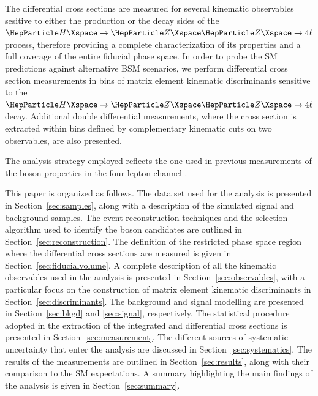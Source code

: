 The differential cross sections are measured for several kinematic observables sesitive to either the production or the decay sides of the $\HZZfl$ process, therefore providing a complete characterization of its properties and a full coverage of the entire fiducial phase space.
In order to probe the SM predictions against alternative BSM scenarios, we perform differential cross section measurements in bins of matrix element kinematic discriminants sensitive to the $\HZZfl$ decay.
Additional double differential measurements, where the cross section is extracted within bins defined by complementary kinematic cuts on two observables, are also presented. 

The analysis strategy employed reflects the one used in previous measurements of the \PH boson properties in the four lepton channel \cite{CMSH4lFiducial8TeV, CMSHIG19001}.

This paper is organized as follows. 
The data set used for the analysis is presented in Section~\ref{sec:samples}, along with a description of the simulated signal and background samples.
The event reconstruction techniques and the selection algorithm used to identify the \PH boson candidates are outlined in Section~\ref{sec:reconstruction}.
The definition of the restricted phase space region where the differential cross sections are measured is given in Section~\ref{sec:fiducialvolume}.
A complete description of all the kinematic observables used in the analysis is presented in Section~\ref{sec:observables}, with a particular focus on the construction of matrix element kinematic discriminants in Section~\ref{sec:discriminants}.
The background and signal modelling are presented in Section~\ref{sec:bkgd} and \ref{sec:signal}, respectively.
The statistical procedure adopted in the extraction of the integrated and differential cross sections is presented in Section~\ref{sec:measurement}. 
The different sources of systematic uncertainty that enter the analysis are discussed in Section~\ref{sec:systematics}.
The results of the measurements are outlined in Section~\ref{sec:results}, along with their comparison to the SM expectations.
A summary highlighting the main findings of the analysis is given in Section~\ref{sec:summary}.

